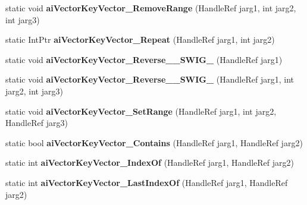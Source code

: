 \begin{DoxyCompactItemize}
\item 
\hypertarget{class_assimp_p_i_n_v_o_k_e_a5c9c12192ee3df7a4a218a41426715c0}{static void {\bfseries ai\+Vector\+Key\+Vector\+\_\+\+Remove\+Range} (Handle\+Ref jarg1, int jarg2, int jarg3)}\label{class_assimp_p_i_n_v_o_k_e_a5c9c12192ee3df7a4a218a41426715c0}

\item 
\hypertarget{class_assimp_p_i_n_v_o_k_e_a49f7e5be56fadfff4417bf2f171fc3c3}{static Int\+Ptr {\bfseries ai\+Vector\+Key\+Vector\+\_\+\+Repeat} (Handle\+Ref jarg1, int jarg2)}\label{class_assimp_p_i_n_v_o_k_e_a49f7e5be56fadfff4417bf2f171fc3c3}

\item 
\hypertarget{class_assimp_p_i_n_v_o_k_e_a39a91984be15c0623d6855ba679b314e}{static void {\bfseries ai\+Vector\+Key\+Vector\+\_\+\+Reverse\+\_\+\+\_\+\+S\+W\+I\+G\+\_} (Handle\+Ref jarg1)}\label{class_assimp_p_i_n_v_o_k_e_a39a91984be15c0623d6855ba679b314e}

\item 
\hypertarget{class_assimp_p_i_n_v_o_k_e_a0cda5fa4f92cfe0708148051302572b8}{static void {\bfseries ai\+Vector\+Key\+Vector\+\_\+\+Reverse\+\_\+\+\_\+\+S\+W\+I\+G\+\_} (Handle\+Ref jarg1, int jarg2, int jarg3)}\label{class_assimp_p_i_n_v_o_k_e_a0cda5fa4f92cfe0708148051302572b8}

\item 
\hypertarget{class_assimp_p_i_n_v_o_k_e_adbd5c60d54518c6b7cd6cafd5a4b7f4f}{static void {\bfseries ai\+Vector\+Key\+Vector\+\_\+\+Set\+Range} (Handle\+Ref jarg1, int jarg2, Handle\+Ref jarg3)}\label{class_assimp_p_i_n_v_o_k_e_adbd5c60d54518c6b7cd6cafd5a4b7f4f}

\item 
\hypertarget{class_assimp_p_i_n_v_o_k_e_a91aa52bf5f9d4049ce62c681ab8a08b2}{static bool {\bfseries ai\+Vector\+Key\+Vector\+\_\+\+Contains} (Handle\+Ref jarg1, Handle\+Ref jarg2)}\label{class_assimp_p_i_n_v_o_k_e_a91aa52bf5f9d4049ce62c681ab8a08b2}

\item 
\hypertarget{class_assimp_p_i_n_v_o_k_e_a5ba2c236b11b3be1305e310158127824}{static int {\bfseries ai\+Vector\+Key\+Vector\+\_\+\+Index\+Of} (Handle\+Ref jarg1, Handle\+Ref jarg2)}\label{class_assimp_p_i_n_v_o_k_e_a5ba2c236b11b3be1305e310158127824}

\item 
\hypertarget{class_assimp_p_i_n_v_o_k_e_a110d45eebbd92f0cc19b5f699875a0cc}{static int {\bfseries ai\+Vector\+Key\+Vector\+\_\+\+Last\+Index\+Of} (Handle\+Ref jarg1, Handle\+Ref jarg2)}\label{class_assimp_p_i_n_v_o_k_e_a110d45eebbd92f0cc19b5f699875a0cc}


\end{DoxyCompactItemize}
